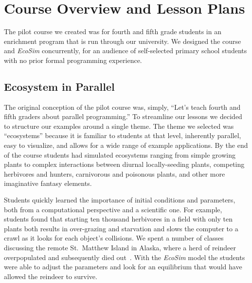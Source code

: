 \documentclass{sig-alternate}
\begin{document}
\section{Course Overview and Lesson Plans}
The pilot course we created was for fourth and fifth grade students in an enrichment program
that is run through our university.  We designed the course and \emph{EcoSim} concurrently,
for an audience of self-selected primary school students with no
prior formal programming experience.

\subsection{Ecosystem in Parallel}
The original conception of the pilot course was, simply, 
``Let's teach fourth and fifth graders about parallel programming.''
To streamline our lessons we decided to structure our examples around a single theme.
The theme we selected was ``ecosystems'' because
it is familiar to students at that level,
inherently parallel, 
easy to visualize, 
and allows for a wide range of example applications.
By the end of the course students had simulated ecosystems
ranging from simple growing plants to complex interactions between 
diurnal locally-seeding plants, competing herbivores and hunters, 
carnivorous and poisonous plants, and other more imaginative fantasy elements.

Students quickly learned the importance of initial conditions and parameters, both from a 
computational perspective and a scientific one.  
For example, students found that starting 
ten thousand herbivores in a field with only ten plants
both results in over-grazing and starvation 
and slows the computer to a crawl as it looks for each object's collisions.
We spent a number of classes discussing the remote St.~Matthew Island in Alaska,
where a herd of reindeer overpopulated and subsequently died out~\cite{klein1968introduction,stMatthewIsland}.
With the \emph{EcoSim} model the students were able to adjust the parameters 
and look for an equilibrium that would have allowed the reindeer to survive.
\end{document}
